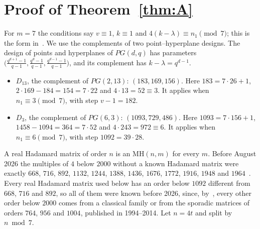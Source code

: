 \documentclass[10pt]{article}
\theoremstyle{remark}
\begin{document}
\section{Proof of Theorem~\ref{thm:A}}\label{sec:A}
For $m=7$ the conditions say $v\equiv1$, $k\equiv1$ and $4(k-\lambda)\equiv n_1 \pmod 7$; this is the form in~\cite[Lemma~4.4]{K}. We use the complements of two point--hyperplane designs. The design of points and hyperplanes of $PG(d,q)$ has parameters $\bigl(\tfrac{q^{d+1}-1}{q-1},\tfrac{q^d-1}{q-1},\tfrac{q^{d-1}-1}{q-1}\bigr)$, and its complement has $k-\lambda=q^{d-1}$.
\begin{itemize}
\item $D_{13}$, the complement of $PG(2,13)$: $(183,169,156)$. Here $183=7\cdot26+1$, $2\cdot169-184=154=7\cdot22$ and $4\cdot13=52\equiv3$. It applies when $n_1\equiv3\pmod7$, with step $v-1=182$.
\item $D_{3}$, the complement of $PG(6,3)$: $(1093,729,486)$. Here $1093=7\cdot156+1$, $1458-1094=364=7\cdot52$ and $4\cdot243=972\equiv6$. It applies when $n_1\equiv6\pmod7$, with step $1092=39\cdot28$.
\end{itemize}

A real Hadamard matrix of order $n$ is an $\mathrm{MH}(n,m)$ for every $m$. Before August 2026 the multiples of $4$ below $2000$ without a known Hadamard matrix were exactly $668$, $716$, $892$, $1132$, $1244$, $1388$, $1436$, $1676$, $1772$, $1916$, $1948$ and $1964$~\cite[\S1]{EKLO}. Every real Hadamard matrix used below has an order below $1092$ different from $668$, $716$ and $892$, so all of them were known before 2026, since, by~\cite[\S4 and Table~4]{EKLO}, every other order below $2000$ comes from a classical family or from the sporadic matrices of orders $764$, $956$ and $1004$, published in 1994--2014. Let $n=4t$ and split by $n \bmod 7$.
\end{document}
